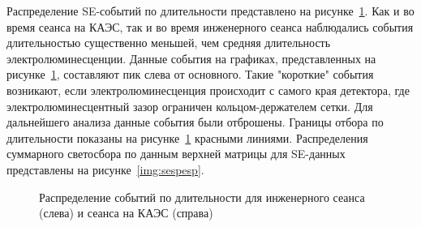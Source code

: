 Распределение SE-событий по длительности представлено на рисунке~\ref{img:seduration}. Как и во время сеанса на КАЭС, так и во время инженерного сеанса наблюдались события длительностью существенно меньшей, чем средняя длительность электролюминесценции. Данные события на графиках, представленных на рисунке~\ref{img:seduration}, составляют пик слева от основного. Такие "короткие" события возникают, если электролюминесценция происходит с самого края детектора, где электролюминесцентный зазор ограничен кольцом-держателем сетки. Для дальнейшего анализа данные события были отброшены. Границы отбора по длительности показаны на рисунке~\ref{img:seduration} красными линиями. Распределения суммарного светосбора по данным верхней матрицы для SE-данных представлены на рисунке~\ref{img:sespesp}.
\begin{figure}[H]
  \begin{minipage}[ht]{0.49\linewidth}    
  \end{minipage}
  \hfill
  \begin{minipage}[ht]{0.49\linewidth}  
  \end{minipage}
  \caption{Распределение событий по длительности для инженерного сеанса (слева) и сеанса на КАЭС (справа)}
  \label{img:seduration}  
\end{figure}

